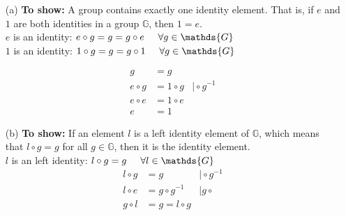 \begin{itemize}
	\item [(a)]
	\textbf{To show:} A group contains exactly one identity element. That is, if \(e\) and \(1\) are both identities
	in a group \(\mathds{G}\), then \(1 = e\).\\
	\(e\) is an identity: \(e \circ g = g = g \circ e \hspace{0.5cm} \forall g \in \mathds{G}\)\\
	\(1\) is an identity: \(1 \circ g = g = g \circ 1 \hspace{0.5cm} \forall g \in \mathds{G}\)
	
	\begin{equation*}
		\begin{array}{rll}
			g &=g &\\
			e \circ g &= 1 \circ g & \vert \circ g^{-1}\\
			e \circ e &= 1 \circ e & \\
			e &= 1 &			
		\end{array}
	\end{equation*}

	\item [(b)]
	\textbf{To show:} If an element \(l\) is a left identity element of \(\mathds{G}\), which means that \(l \circ g = g\) for all \(g \in \mathds{G}\), then it is the identity element.\\
	\(l\) is an left identity: \(l \circ g = g \hspace{0.5cm} \forall l \in \mathds{G}\)\\
	\begin{equation*}
		\begin{array}{rll}
			l \circ g &=g & \vert \circ g^{-1}\\
			l \circ e &= g \circ g^{-1} & \vert  g \circ\\
			g \circ l &= g = l \circ g & \\		
		\end{array}
	\end{equation*}


\end{itemize}
